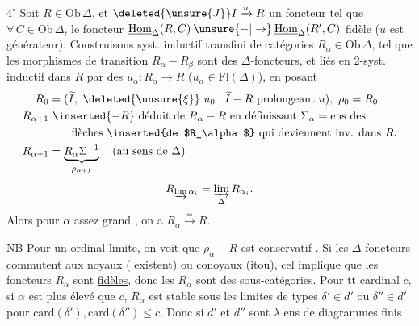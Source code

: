 \textcircled{$4^\circ$} Soit $R\in\mathrm{Ob}\,\Delta$, et $\deleted{\unsure{J}}I\xrightarrow{u}R$ un foncteur  tel que $\forall\,C\in\mathrm{Ob}\,\Delta$, le foncteur $\underline{\mathrm{Hom}}_\Delta(R,C)\mathbin{\unsure{-|\to}}\underline{\mathrm{Hom}}_{\Delta}(R',C)$ fidèle ($u$ est générateur). Construisons syst. inductif transfini de catégories $R_\alpha\in\mathrm{Ob}\,\Delta$,  tel que les morphismes de transition $R_\alpha\mathbin{-}R_\beta$ sont des $\Delta$-foncteurs, et liés en  2-syst. inductif dans $R$ par des $u_\alpha:R_\alpha\longrightarrow R$  ($u_\alpha\in\mathrm{Fl}(\Delta)$), en posant
\[
\begin{aligned}
R_0 &=(\widetilde I,\ \deleted{\unsure{\xi}}\ u_0:\widetilde I\mathbin{-}R\text{ prolongeant }u),\ \rho_0=R_0\\
R_{\alpha+1}&\ \inserted{\mathbin{-}R}\ \text{déduit de }R_\alpha\mathbin{-}R\text{ en définissant }
\Sigma_\alpha=\text{ens des}\\
&\qquad\text{flèches \inserted{de $R_\alpha$} qui deviennent inv. dans }R.\\
R_{\alpha+1}&=\underbrace{R_\alpha\Sigma^{-1}}_{\rho_{\alpha+1}}\quad\text{(au sens de }\Delta)
\end{aligned}
\]
\[
 R_{\varinjlim\alpha_i}=\varinjlim_{\Delta}R_{\alpha_i}.
\]
Alors pour $\alpha$ assez grand , on a $R_\alpha\xrightarrow{\simeq}R$.

\uline{NB} Pour un ordinal limite, on voit que $\rho_\alpha\mathbin{-}R$ est conservatif . Si les $\Delta$-foncteurs   commutent aux noyaux (   existent) ou conoyaux (itou), cel implique que les foncteurs $R_\alpha$ sont  \uline{fidèles}, donc les $R_\alpha$ sont des sous-catégories. Pour tt cardinal $c$, si $\alpha$ est plus élevé que $c$, $R_\alpha$ est stable sous les limites de types $\delta'\in d'$ ou $\delta''\in d'$ pour $\mathrm{card}(\delta'),\mathrm{card}(\delta'')\leq c$. Donc si $d'$ et $d''$ sont 
$\lambda$ ens de diagrammes finis


